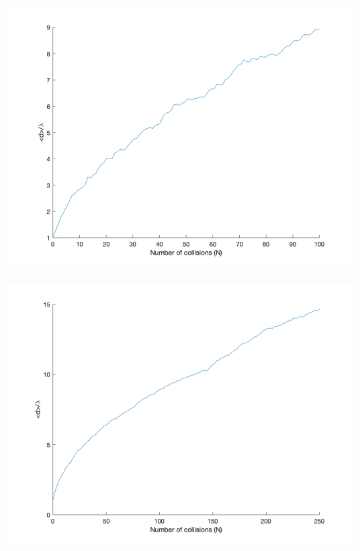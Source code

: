\documentclass[12pt]{article}
\begin{document}
\begin{figure}[htp]
\centering

\begin{subfigure}{0.49\columnwidth}
\centering
\includegraphics[width=\textwidth]{100.png}
\caption{}
\label{fig:time1}
\end{subfigure}\hfill
\begin{subfigure}{0.49\columnwidth}
\centering
\includegraphics[width=\textwidth]{250.png}
\caption{}
\label{fig:time2}
\end{subfigure}

\medskip


\end{figure}
\end{document}
